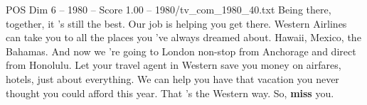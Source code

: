 \begin{textsample}{POS Dim 6 – 1980 – Score 1.00 – 1980/tv\_com\_1980\_40.txt}  \label{ex:f6_pos_053}
Being there, together, it 's still the best.
Our job is helping you get there.
Western Airlines can take you to all the places you 've always dreamed about.
Hawaii, Mexico, the Bahamas.
And now we 're going to London non-stop from Anchorage and direct from Honolulu.
Let your travel agent in Western save you money on airfares, hotels, just about everything.
We can help you have that vacation you never thought you could afford this year.
That 's the Western way.
So, \textbf{miss} you.

\end{textsample}
